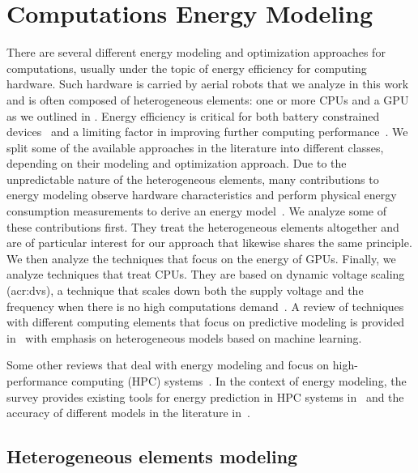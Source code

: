 \section{Computations Energy Modeling}
\label{sec:soa-ene-mod}

There are several different energy modeling and optimization approaches for computations, usually under the topic of energy efficiency for computing hardware.
Such hardware is carried by aerial robots that we analyze in this work and is often composed of heterogeneous elements: one or more CPUs and a GPU as we outlined in . Energy efficiency is critical for both battery constrained devices~\citep{seewald202Xenergy} and a limiting factor in improving further computing performance~\citep{horowitz2014computing}. We split some of the available approaches in the literature into different classes, depending on their modeling and optimization approach. Due to the unpredictable nature of the heterogeneous elements, many contributions to energy modeling observe hardware characteristics and perform physical energy consumption measurements to derive an energy model~\citep{teamplay}. We analyze some of these contributions first. They treat the heterogeneous elements altogether and are of particular interest for our approach that likewise shares the same principle. We then analyze the techniques that focus on the energy of GPUs. Finally, we analyze techniques that treat CPUs. They are based on dynamic voltage scaling (\Gls{acr:dvs}), a technique that scales down both the supply voltage and the frequency when there is no high computations demand~\citep{flautner2001automatic, chen2009fundamentals}. A review of techniques with different computing elements that focus on predictive modeling is provided in~\citep{oneal2018predictive} with emphasis on heterogeneous models based on machine learning.

Some other reviews that deal with energy modeling and focus on high-performance computing (HPC) systems~\citep{obrien2017survey,czarnul2019energy}. In the context of energy modeling, the survey provides existing tools for energy prediction in HPC systems in~\citep{czarnul2019energy} and the accuracy of different models in the literature in~\citep{obrien2017survey}. 

\subsection{Heterogeneous elements modeling}

